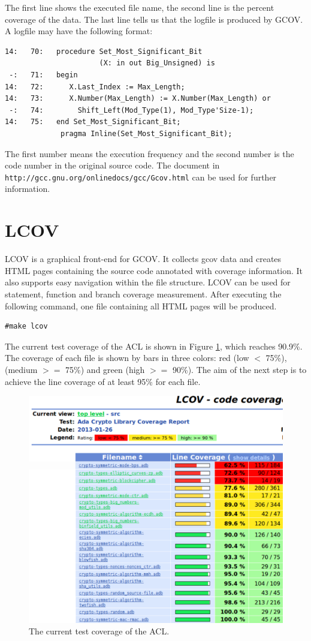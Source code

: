 The first line shows the executed file name, the second line is the
percent coverage of the data. The last line tells us that the logfile
is produced by GCOV. A logfile may have the following format:
\begin{lstlisting} 
14:   70:   procedure Set_Most_Significant_Bit
                      (X: in out Big_Unsigned) is
 -:   71:   begin
14:   72:      X.Last_Index := Max_Length;
14:   73:      X.Number(Max_Length) := X.Number(Max_Length) or
 -:   74:        Shift_Left(Mod_Type(1), Mod_Type'Size-1);
14:   75:   end Set_Most_Significant_Bit; 
	         pragma Inline(Set_Most_Significant_Bit);
\end{lstlisting}
The first number means the execution frequency and the second number
is the code number in the original source code. The document in {\tt
  http://gcc.gnu.org/onlinedocs/gcc/Gc\-ov.html} can be used for
further information.
\section{LCOV}
LCOV is a graphical front-end for GCOV. It collects gcov data and
creates HTML pages containing the source code annotated with coverage
information. It also supports easy navigation within the file
structure. LCOV can be used for statement, function and branch
coverage measurement.  After executing the following command, one file
containing all HTML pages will be produced.
\begin{lstlisting}[style=BashInputStyle]
  #make lcov
\end{lstlisting}
 The current test coverage of the ACL is
shown in Figure \ref{LCOVS}, which reaches 90.9\%. The coverage of
each file is shown by bars in three colors: red (low $<$ 75\%),
(medium $>=$ 75\%) and green (high $>=$ 90\%). The aim of the next
step is to achieve the line coverage of at least 95\% for each file.

\begin{figure}[h]
  \includegraphics[scale=0.4]{./images//LCOV2}
  \caption{The current test coverage of the ACL.}\label{LCOVS}
\end{figure}
